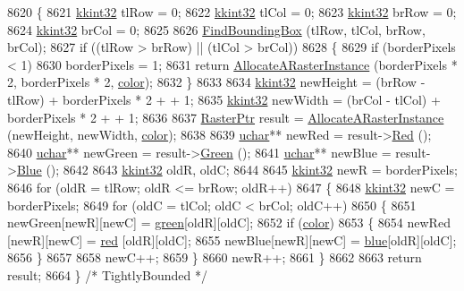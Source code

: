 \begin{DoxyCode}
8620 \{
8621   \hyperlink{namespace_k_k_b_a8fa4952cc84fda1de4bec1fbdd8d5b1b}{kkint32}  tlRow = 0;
8622   \hyperlink{namespace_k_k_b_a8fa4952cc84fda1de4bec1fbdd8d5b1b}{kkint32}  tlCol = 0;
8623   \hyperlink{namespace_k_k_b_a8fa4952cc84fda1de4bec1fbdd8d5b1b}{kkint32}  brRow = 0;
8624   \hyperlink{namespace_k_k_b_a8fa4952cc84fda1de4bec1fbdd8d5b1b}{kkint32}  brCol = 0;
8625 
8626   \hyperlink{class_k_k_b_1_1_raster_aee22b87a6feeb8a3e4a388400a23f616}{FindBoundingBox} (tlRow, tlCol, brRow, brCol);
8627   \textcolor{keywordflow}{if}  ((tlRow > brRow)  ||  (tlCol > brCol))
8628   \{
8629     \textcolor{keywordflow}{if}  (borderPixels < 1)
8630       borderPixels = 1;
8631     \textcolor{keywordflow}{return} \hyperlink{class_k_k_b_1_1_raster_aa879980d112c01cb7ad9a3cfc7cd6f64}{AllocateARasterInstance} (borderPixels * 2, borderPixels * 2, 
      \hyperlink{class_k_k_b_1_1_raster_a482384d89cc53fa4f36276307c746854}{color});
8632   \}
8633 
8634   \hyperlink{namespace_k_k_b_a8fa4952cc84fda1de4bec1fbdd8d5b1b}{kkint32}  newHeight = (brRow - tlRow) + borderPixels * 2 +  + 1;
8635   \hyperlink{namespace_k_k_b_a8fa4952cc84fda1de4bec1fbdd8d5b1b}{kkint32}  newWidth  = (brCol - tlCol) + borderPixels * 2 +  + 1;
8636 
8637   \hyperlink{class_k_k_b_1_1_raster}{RasterPtr}  result = \hyperlink{class_k_k_b_1_1_raster_aa879980d112c01cb7ad9a3cfc7cd6f64}{AllocateARasterInstance} (newHeight, newWidth, 
      \hyperlink{class_k_k_b_1_1_raster_a482384d89cc53fa4f36276307c746854}{color});
8638 
8639   \hyperlink{namespace_k_k_b_ace9969169bf514f9ee6185186949cdf7}{uchar}**  newRed   = result->\hyperlink{class_k_k_b_1_1_raster_a337a5a064b27693eec6e380789680239}{Red}   ();
8640   \hyperlink{namespace_k_k_b_ace9969169bf514f9ee6185186949cdf7}{uchar}**  newGreen = result->\hyperlink{class_k_k_b_1_1_raster_a2dbd81f2cb60b3716bcf6467050dde93}{Green} ();
8641   \hyperlink{namespace_k_k_b_ace9969169bf514f9ee6185186949cdf7}{uchar}**  newBlue  = result->\hyperlink{class_k_k_b_1_1_raster_ae289ec3ad3a27339cd30e9ac3b488004}{Blue}  ();
8642 
8643   \hyperlink{namespace_k_k_b_a8fa4952cc84fda1de4bec1fbdd8d5b1b}{kkint32}  oldR, oldC;
8644 
8645   \hyperlink{namespace_k_k_b_a8fa4952cc84fda1de4bec1fbdd8d5b1b}{kkint32}  newR = borderPixels;
8646   \textcolor{keywordflow}{for}  (oldR = tlRow;  oldR <= brRow;  oldR++)
8647   \{
8648     \hyperlink{namespace_k_k_b_a8fa4952cc84fda1de4bec1fbdd8d5b1b}{kkint32}  newC = borderPixels;
8649     \textcolor{keywordflow}{for}  (oldC = tlCol;  oldC < brCol;  oldC++)
8650     \{
8651       newGreen[newR][newC] = \hyperlink{class_k_k_b_1_1_raster_a2d2238911145488e226cd2e34fc8448c}{green}[oldR][oldC];
8652       \textcolor{keywordflow}{if}  (\hyperlink{class_k_k_b_1_1_raster_a482384d89cc53fa4f36276307c746854}{color})
8653       \{
8654         newRed [newR][newC] = \hyperlink{class_k_k_b_1_1_raster_a7fd39e0463c8477d0d0d26e11126d285}{red} [oldR][oldC];
8655         newBlue[newR][newC] = \hyperlink{class_k_k_b_1_1_raster_a0265be7ea30f5b1f9d6310a79bee868b}{blue}[oldR][oldC];
8656       \}
8657       
8658       newC++;
8659     \}
8660     newR++;
8661   \}
8662 
8663   \textcolor{keywordflow}{return}  result;
8664 \}  \textcolor{comment}{/* TightlyBounded */}
\end{DoxyCode}

